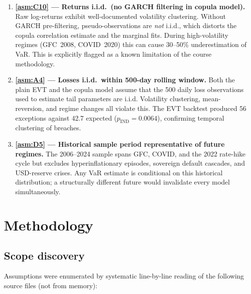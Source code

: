 \documentclass[11pt,a4paper]{article}
\begin{document}
\begin{enumerate}
  \item \textbf{\cref{asm:C10} --- Returns i.i.d.\ (no GARCH filtering in
    copula model).} Raw log-returns exhibit well-documented volatility
    clustering. Without GARCH pre-filtering, pseudo-observations are \emph{not}
    i.i.d., which distorts the copula correlation estimate and the marginal
    fits. During high-volatility regimes (GFC~2008, COVID~2020) this can
    cause 30--50\% underestimation of VaR. This is explicitly flagged as a
    known limitation of the course methodology.

  \item \textbf{\cref{asm:A4} --- Losses i.i.d.\ within 500-day rolling
    window.} Both the plain EVT and the copula model assume that the 500
    daily loss observations used to estimate tail parameters are i.i.d.
    Volatility clustering, mean-reversion, and regime changes all violate
    this. The EVT backtest produced 56 exceptions against 42.7 expected
    ($p_{\mathrm{IND}} = 0.0064$), confirming temporal clustering of
    breaches.

  \item \textbf{\cref{asm:D5} --- Historical sample period representative
    of future regimes.} The 2006--2024 sample spans GFC, COVID, and the
    2022 rate-hike cycle but excludes hyperinflationary episodes, sovereign
    default cascades, and USD-reserve crises. Any VaR estimate is
    conditional on this historical distribution; a structurally different
    future would invalidate every model simultaneously.
\end{enumerate}

\section{Methodology}\label{sec:methodology}

\subsection{Scope discovery}\label{sec:scope-discovery}

Assumptions were enumerated by systematic line-by-line reading of the
following source files (not from memory):
\end{document}
